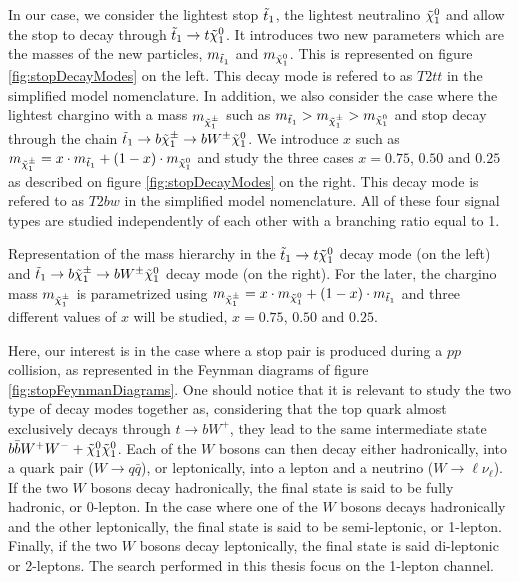         In our case, we consider the lightest stop $\tilde{t}_1$, the lightest neutralino 
        $\tilde{\chi}_1^0$ and allow the stop to decay through $\tilde{t}_1 \rightarrow t \tilde{\chi}_1^0$. 
        It introduces two new parameters which are the masses of the new particles, $m_{\tilde{t}_1}$ 
        and $m_{\tilde{\chi}_1^0}$. This is represented on figure \ref{fig:stopDecayModes} on the left. 
        This decay mode is refered to as $T2tt$ in the simplified model nomenclature. In addition, 
        we also consider the case where the lightest chargino with a mass $m_{\tilde{\chi}_1^\pm}$ such 
        as $m_{\tilde{t}_1} > m_{\tilde{\chi}_1^\pm} > m_{\tilde{\chi}_1^0}$ and stop decay through the 
        chain $\tilde{t}_1 \rightarrow b \tilde{\chi}_1^\pm \rightarrow b W^{\pm} \tilde{\chi}_1^0$. We introduce 
        $x$ such as $m_{\tilde{\chi}_1^\pm} = x \cdot m_{\tilde{t}_1} + (1 - x) \cdot m_{\tilde{\chi}_1^0}$ 
        and study the three cases $x = 0.75$, $0.50$ and $0.25$ as described on figure \ref{fig:stopDecayModes} 
        on the right. This decay mode is refered to as $T2bw$ in the simplified model nomenclature. 
        All of these four signal types are studied independently of each other with a branching ratio 
        equal to 1.

                     {Representation of the mass hierarchy in the $\tilde{t}_1 \rightarrow t \tilde{\chi}_1^0$ 
                     decay mode (on the left) and $\tilde{t}_1 \rightarrow b \tilde{\chi}_1^\pm \rightarrow b W^{\pm} 
                     \tilde{\chi}_1^0 $ decay mode (on the right). For the later, the chargino mass $m_{\tilde{\chi}_1^\pm}$ 
                     is parametrized using $m_{\tilde{\chi}_1^\pm} = x \cdot m_{\tilde{\chi}_1^0} + (1 - x) \cdot m_{\tilde{t}_1}$ 
                     and three different values of $x$ will be studied, $x = 0.75$, $0.50$ and $0.25$.} 
    
        Here, our interest is in the case where a stop pair is produced during a $pp$ collision, 
        as represented in the Feynman diagrams of figure \ref{fig:stopFeynmanDiagrams}. One should 
        notice that it is relevant to study the two type of decay modes together as, considering 
        that the top quark almost exclusively decays through $t \rightarrow b W^+$, they lead to 
        the same intermediate state $b \bar{b} W^+ W^- + \tilde{\chi}_1^0 \tilde{\chi}_1^0$. Each of the 
        $W$ bosons can then decay either hadronically, into a quark pair ($W \rightarrow q\bar{q}$), 
        or leptonically, into a lepton and a neutrino ($W \rightarrow \ell \nu_{\ell}$). If the two 
        $W$ bosons decay hadronically, the final state is said to be fully hadronic, or 0-lepton. 
        In the case where one of the $W$ bosons decays hadronically and the other leptonically, the 
        final state is said to be semi-leptonic, or 1-lepton. Finally, if the two $W$ bosons decay 
        leptonically, the final state is said di-leptonic or 2-leptons. The search performed in this 
        thesis focus on the 1-lepton channel. 

